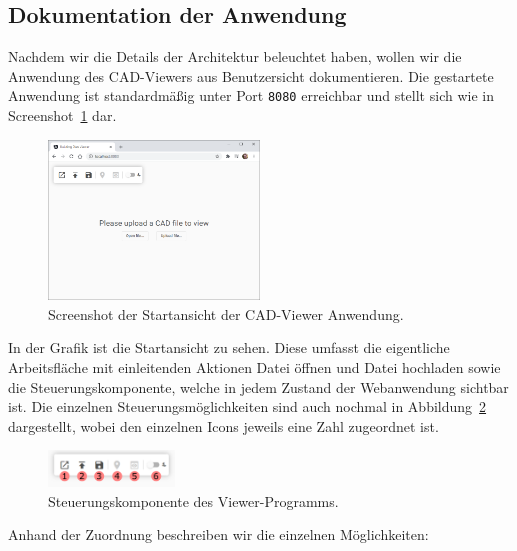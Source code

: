 \subsection{Dokumentation der Anwendung}
\label{subsec:documentation}

Nachdem wir die Details der Architektur beleuchtet haben, wollen wir die Anwendung des CAD-Viewers aus Benutzersicht dokumentieren.
Die gestartete Anwendung ist standardmäßig unter Port \texttt{8080} erreichbar und stellt sich wie in Screenshot~\ref{fig:app-screenshot} dar.

\begin{figure}[h]
    \includegraphics[width=0.5\textwidth]{res/app-screenshot.png}
    \caption{Screenshot der Startansicht der CAD-Viewer Anwendung.}
    \label{fig:app-screenshot}
\end{figure}

In der Grafik ist die Startansicht zu sehen.
Diese umfasst die eigentliche Arbeitsfläche mit einleitenden Aktionen \glqq{}Datei öffnen\grqq{} und \glqq{}Datei hochladen\grqq{} sowie die Steuerungskomponente, welche in jedem Zustand der Webanwendung sichtbar ist.
Die einzelnen Steuerungsmöglichkeiten sind auch nochmal in Abbildung~\ref{fig:controls-component} dargestellt, wobei den einzelnen Icons jeweils eine Zahl zugeordnet ist.

\begin{figure}
    \centering
    \includegraphics[width=0.3\textwidth]{res/controls.pdf}
    \caption{Steuerungskomponente des Viewer-Programms.}
    \label{fig:controls-component}
\end{figure}

Anhand der Zuordnung beschreiben wir die einzelnen Möglichkeiten:

